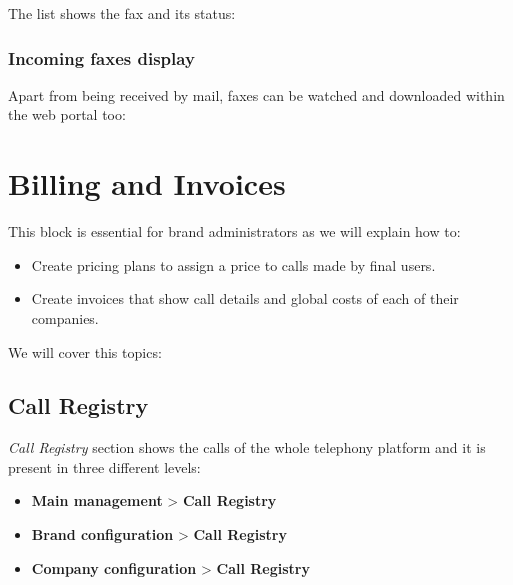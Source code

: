 \documentclass[letterpaper,10pt,english]{sphinxmanual}
\begin{document}

The list shows the fax and its status:



\subsection{Incoming faxes display}
\label{faxing/index:incoming-faxes-display}
Apart from being received by mail, faxes can be watched and downloaded within
the web portal too:

\noindent{}


\chapter{Billing and Invoices}
\label{billing_and_invoices/index::doc}\label{billing_and_invoices/index:billing-and-invoices}
This block is essential for brand administrators as we will explain how to:
\begin{itemize}
\item {} 
Create pricing plans to assign a price to calls made by final users.

\item {} 
Create invoices that show call details and global costs of each of their companies.

\end{itemize}

We will cover this topics:


\section{Call Registry}
\label{billing_and_invoices/call_registry::doc}\label{billing_and_invoices/call_registry:call-registry}\label{billing_and_invoices/call_registry:id1}
\emph{Call Registry} section shows the calls of the whole telephony platform and it
is present in three different levels:
\begin{itemize}
\item {} 
\textbf{Main management} \textgreater{} \textbf{Call Registry}

\item {} 
\textbf{Brand configuration} \textgreater{} \textbf{Call Registry}

\item {} 
\textbf{Company configuration} \textgreater{} \textbf{Call Registry}

\end{itemize}
\end{document}
